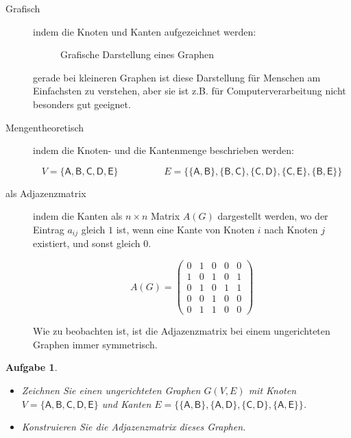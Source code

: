 \documentclass[12pt,a4paper]{report}
\theoremstyle{break}
\newtheorem{exercise}{Aufgabe}[chapter]
\theoremstyle{plain}
\begin{document}
\begin{description}
\item[Grafisch] indem die Knoten und Kanten aufgezeichnet werden:

\begin{figure}[H]
\centerline{
}
\caption{Grafische Darstellung eines Graphen}
\label{fig:GrafischeDarstellung}
\end{figure}
gerade bei kleineren Graphen ist diese Darstellung f\"{u}r Menschen am
Einfachsten zu verstehen, aber sie ist z.B. f\"{u}r
Computerverarbeitung nicht besonders gut geeignet.
\item[Mengentheoretisch] indem die Knoten- und die Kantenmenge
  beschrieben werden:

\begin{displaymath}
V = \{\mathsf{A,B,C,D,E}\}\hspace{2cm}E = \{\mathsf{\{A,B\}, \{B,C\},
  \{C,D\}, \{C,E\}, \{B,E\}}\}
\end{displaymath}

\item[\textnormal{als} Adjazenzmatrix] indem die Kanten als $n\times{n}$ Matrix $A(G)$
  dargestellt werden, wo der Eintrag $a_{ij}$ gleich $1$ ist, wenn eine Kante
  von Knoten $i$ nach Knoten $j$ existiert, und sonst gleich $0$.

\begin{displaymath}
A(G) = \left( 
\begin{array}{ccccc}
0 & 1 & 0 & 0 & 0 \\
1 & 0 & 1 & 0 & 1 \\
0 & 1 & 0 & 1 & 1 \\
0 & 0 & 1 & 0 & 0 \\
0 & 1 & 1 & 0 & 0 
\end{array}
\right)
\end{displaymath}

Wie zu beobachten ist, ist die Adjazenzmatrix bei einem ungerichteten
Graphen immer symmetrisch.
\end{description}

\begin{exercise}\label{exrep}
\begin{itemize}
\item Zeichnen Sie einen ungerichteten Graphen $G(V,E)$ mit Knoten 
$V = \{\mathsf{A,B,C,D,E}\}$ und Kanten 
$E = \{\mathsf{\{A, B\}, \{A, D\}, \{C, D\}, \{A, E\}}\}$.
\item Konstruieren Sie die Adjazenzmatrix dieses Graphen.
\end{itemize}
\end{exercise}
\end{document}
